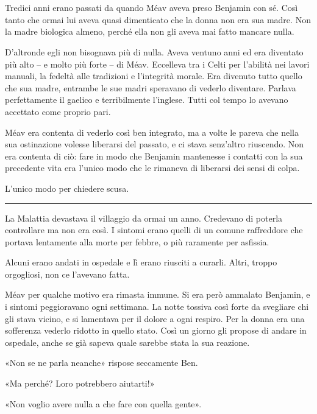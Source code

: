 \chapter{}
\label{ch:6}

Tredici anni erano passati da quando Méav aveva preso Benjamin con sé. Così tanto che ormai lui
aveva quasi dimenticato che la donna non era sua madre. Non la madre biologica almeno, perché ella
non gli aveva mai fatto mancare nulla.

D'altronde egli non bisognava più di nulla. Aveva ventuno anni ed era diventato più alto -- e molto
più forte -- di Méav. Eccelleva tra i Celti per l'abilità nei lavori manuali, la fedeltà alle
tradizioni e l'integrità morale. Era divenuto tutto quello che sua madre, entrambe le sue madri
speravano di vederlo diventare. Parlava perfettamente il gaelico e terribilmente l'inglese. Tutti
col tempo lo avevano accettato come proprio pari.

Méav era contenta di vederlo così ben integrato, ma a volte le pareva che nella sua ostinazione
volesse liberarsi del passato, e ci stava senz'altro riuscendo. Non era contenta di ciò: fare in
modo che Benjamin mantenesse i contatti con la sua precedente vita era l'unico modo che le rimaneva
di liberarsi dei sensi di colpa.

L'unico modo per chiedere scusa.

\plainbreak{1}

La Malattia devastava il villaggio da ormai un anno. Credevano di poterla controllare ma non era
così. I sintomi erano quelli di un comune raffreddore che portava lentamente alla morte per febbre,
o più raramente per asfissia.

Alcuni erano andati in ospedale e lì erano riusciti a curarli. Altri, troppo orgogliosi, non ce
l'avevano fatta.

Méav per qualche motivo era rimasta immune. Si era però ammalato Benjamin, e i sintomi peggioravano
ogni settimana. La notte tossiva così forte da svegliare chi gli stava vicino, e si lamentava per il
dolore a ogni respiro. Per la donna era una sofferenza vederlo ridotto in quello stato. Così un
giorno gli propose di andare in ospedale, anche se già sapeva quale sarebbe stata la sua reazione.

«Non se ne parla neanche» rispose seccamente Ben.

«Ma perché? Loro potrebbero aiutarti!»

«Non voglio avere nulla a che fare con quella gente».

